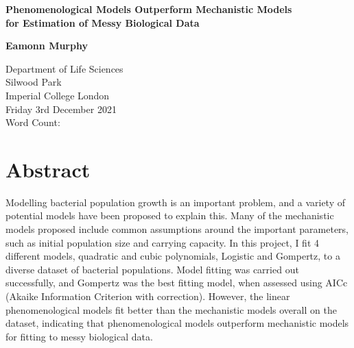 \documentclass[11pt,a4wide,titlepage]{article}
\newcommand{\quickwordcount}[1]{
		
}
\begin{document}
\begin{titlepage}
	\begin{center}
		\vspace*{1cm}
		
		\begin{Large}
			\textbf{Phenomenological Models Outperform Mechanistic Models\\
				for Estimation of Messy Biological Data}
		\end{Large}
		
		
		\vspace{1.5cm}
		
		\textbf{Eamonn Murphy}
		
		\vfill
		
		Department of Life Sciences\\
		Silwood Park\\
		Imperial College London\\
		\vspace{\baselineskip}
		Friday 3rd December 2021\\
		\vspace{\baselineskip}
		Word Count: \quickwordcount{main}
		\vfill
		
	\end{center}
\end{titlepage}
\linenumbers
\section*{Abstract}
Modelling bacterial population growth is an important problem, and a variety of potential models have been proposed to explain this. Many of the mechanistic models proposed include common assumptions around the important parameters, such as initial population size and carrying capacity. In this project, I fit 4 different models, quadratic and cubic polynomials, Logistic and Gompertz, to a diverse dataset of bacterial populations. Model fitting was carried out successfully, and Gompertz was the best fitting model, when assessed using AICc (Akaike Information Criterion with correction). However, the linear phenomenological models fit better than the mechanistic models overall on the dataset, indicating that phenomenological models outperform mechanistic models for fitting to messy biological data.
\end{document}
